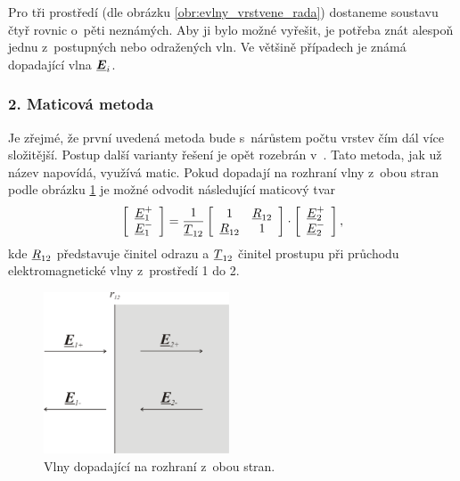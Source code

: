 Pro tři prostředí (dle obrázku \ref{obr:evlny_vrstvene_rada}) dostaneme soustavu čtyř rovnic o~pěti neznámých. Aby ji bylo možné vyřešit, je potřeba znát alespoň jednu z~postupných nebo odražených vln. Ve většině případech je známá dopadající vlna $\mbox{\underline{\boldmath$E$}}_{i}$. 

\subsubsection*{2. Maticová metoda}
Je zřejmé, že první uvedená metoda bude s~nárůstem počtu vrstev čím dál více složitější. Postup další varianty řešení je opět rozebrán v~\cite[str. 105]{emp}. Tato metoda, jak už název napovídá, využívá matic. Pokud dopadají na rozhraní vlny z~obou stran podle obrázku \ref{obr:evlny_maticova_metoda1} je možné odvodit následující maticový tvar
\begin{equation}
\left[ \begin{array}{c}
{\underline{E}}_{1}^{+} \\
{\underline{E}}_{1}^{-} \\
\end{array} \right]
= 
\frac{1}{{\underline{T}}_ {12}}
\left[ \begin{array}{cc}
1 & {\underline{R}}_{12} \\
{\underline{R}}_{12} & 1 \\
\end{array} \right]
\cdot
\left[ \begin{array}{c}
{\underline{E}}_{2}^{+} \\
{\underline{E}}_{2}^{-} \\
\end{array} \right],
\label{rce:evlny_maticova_rozhrani}
\end{equation}
kde ${\underline{R}}_{12}$ představuje činitel odrazu a ${\underline{T}}_ {12}$ činitel prostupu při průchodu elektromagnetické vlny z~prostředí 1 do 2. 
\begin{figure}[!h]
	\centering
	\includegraphics[width=5.5cm]{evlny_maticova_metoda1.png}
	\caption{Vlny dopadající na rozhraní z~obou stran. \cite{emp}}
	\label{obr:evlny_maticova_metoda1}
\end{figure}

